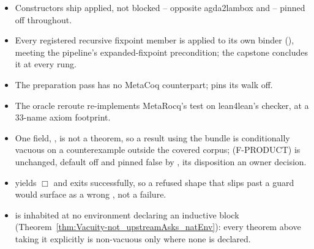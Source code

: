 \begin{itemize}
\item {} Constructors ship applied, not blocked -- opposite agda2lambox and
 -- pinned off throughout.
\item {} Every registered recursive fixpoint member is applied to its own binder
(), meeting the pipeline's expanded-fixpoint precondition; the capstone
concludes it at every rung.
\item {} The preparation pass has no MetaCoq counterpart;  pins
its  walk off.
\item {} The oracle reroute re-implements MetaRocq's test on lean4lean's checker, at
a 33-name axiom footprint.
\item {} One  field, , is not a
theorem, so a result using the bundle is conditionally vacuous on a counterexample outside the
covered corpus;  (F-PRODUCT) is unchanged, default off
and pinned false by , its disposition an owner decision.
\item {}  yields $\Box$ and exits successfully, so a refused shape that
slips past a guard would surface as a wrong , not a failure.
\item {}  is inhabited at no environment declaring an inductive
block (Theorem~\ref{thm:Vacuity-not_upstreamAsks_natEnv}): every theorem above taking it
explicitly is non-vacuous only where none is declared.
\end{itemize}
